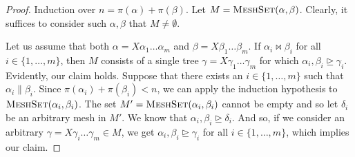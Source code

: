 \documentclass[11pt,a4paper]{amsart}
\theoremstyle{definition}
\newcommand{\MeshSet}[2]{\textsc{MeshSet}(#1,#2)}
\newcommand{\potential}[1]{\pi(#1)}
\begin{document}
\begin{proof}
        Induction over $n = \potential{\alpha} + \potential{\beta}$. Let $M =
        \MeshSet{\alpha}{\beta}$.  Clearly, it suffices to consider such
        $\alpha,\beta$ that $M \neq \emptyset$.
        
        Let us assume that both $\alpha = X \alpha_1 \ldots \alpha_m$ and $\beta
        = X \beta_1 \ldots \beta_m$. If $\alpha_i \bowtie \beta_i$ for all $i \in
        \{1,\ldots,m\}$, then $M$ consists of a single tree $\gamma = X \gamma_1
        \ldots \gamma_m$ for which $\alpha_i,\beta_i \trianglerighteq \gamma_i$.
        Evidently, our claim holds. Suppose that there exists an $i \in
        \{1,\ldots,m\}$ such that $\alpha_i \parallel \beta_i$. Since
        $\potential{\alpha_i} + \potential{\beta_i} < n$, we can apply the
        induction hypothesis to $\MeshSet{\alpha_i}{\beta_i}$.  The set
        $M' = \MeshSet{\alpha_i}{\beta_i}$ cannot be empty and so let $\delta_i$ be
        an arbitrary mesh in $M'$. We know that $\alpha_i,\beta_i
        \trianglerighteq \delta_i$. And so, if we consider an arbitrary $\gamma
        = X \gamma_i \ldots \gamma_m \in M$, we get $\alpha_i,\beta_i
        \trianglerighteq \gamma_i$ for all $i \in \{1,\ldots,m\}$, which implies
        our claim.


\end{proof}
\end{document}
